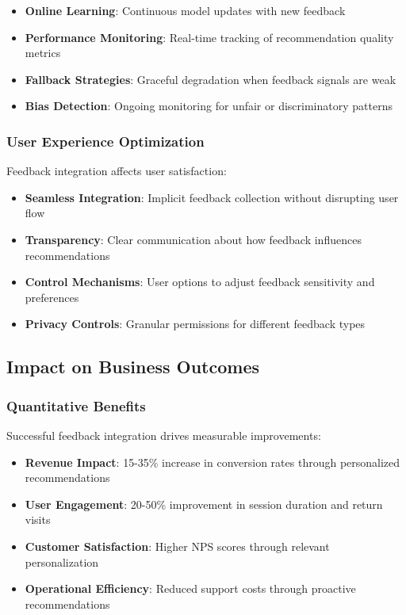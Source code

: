 \documentclass[acmsmall,review,anonymous]{acmart}
\begin{document}
\begin{itemize}
    \item \textbf{Online Learning}: Continuous model updates with new feedback
    \item \textbf{Performance Monitoring}: Real-time tracking of recommendation quality metrics
    \item \textbf{Fallback Strategies}: Graceful degradation when feedback signals are weak
    \item \textbf{Bias Detection}: Ongoing monitoring for unfair or discriminatory patterns
\end{itemize}

\subsubsection{User Experience Optimization}

Feedback integration affects user satisfaction:

\begin{itemize}
    \item \textbf{Seamless Integration}: Implicit feedback collection without disrupting user flow
    \item \textbf{Transparency}: Clear communication about how feedback influences recommendations
    \item \textbf{Control Mechanisms}: User options to adjust feedback sensitivity and preferences
    \item \textbf{Privacy Controls}: Granular permissions for different feedback types
\end{itemize}

\subsection{Impact on Business Outcomes}

\subsubsection{Quantitative Benefits}

Successful feedback integration drives measurable improvements:

\begin{itemize}
    \item \textbf{Revenue Impact}: 15-35\% increase in conversion rates through personalized recommendations
    \item \textbf{User Engagement}: 20-50\% improvement in session duration and return visits
    \item \textbf{Customer Satisfaction}: Higher NPS scores through relevant personalization
    \item \textbf{Operational Efficiency}: Reduced support costs through proactive recommendations
\end{itemize}
\end{document}
